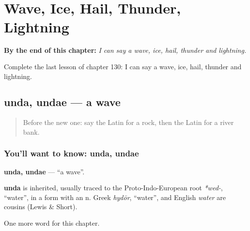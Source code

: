 
\chapter{Wave, Ice, Hail, Thunder, Lightning}
\label{ch:la-wave-ice-hail-thunder-lightning}

\begin{chapteropening}
\textbf{By the end of this chapter:} \emph{I can say a wave, ice, hail, thunder and lightning.}

Complete the last lesson of chapter 130: I can say a wave, ice, hail, thunder and lightning.
\end{chapteropening}

\section[unda, undae]{unda, undae — a wave}

\label{lesson:LA-C130-unda}



\begin{quote}
Before the new one: say the Latin for a rock, then the Latin for a river bank.
\end{quote}

\subsection*{You'll want to know: unda, undae}
\textbf{unda, undae} — \textquotedblleft{}a wave\textquotedblright{}.

\begin{cousinweb}
\textbf{unda} is inherited, usually traced to the Proto-Indo-European root \emph{*wed-}, \textquotedblleft{}water\textquotedblright{}, in a form with an n. Greek \emph{hydōr}, \textquotedblleft{}water\textquotedblright{}, and English \emph{water} are cousins (Lewis \& Short).
\end{cousinweb}

\begin{grammarlens}[title={What you've built}]
One more word for this chapter.
\end{grammarlens}

